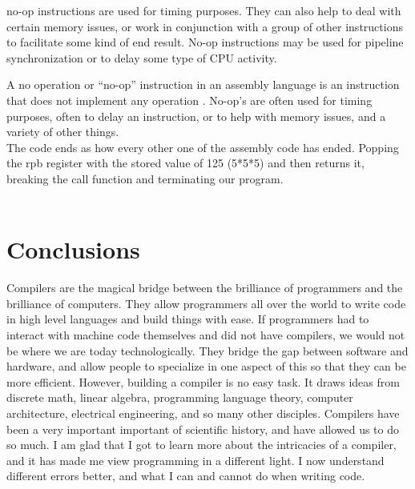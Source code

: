 \documentclass{article}
\theoremstyle{theorem}
\theoremstyle{definition}
\theoremstyle{remark}
\begin{document}
no-op instructions are used for timing purposes. They can also help to deal with certain memory issues, or work in conjunction with a group of other instructions to facilitate some kind of end result. No-op instructions may be used for pipeline synchronization or to delay some type of CPU activity.

A no operation or “no-op” instruction in an assembly language is an instruction that does not implement any operation \cite{TECHNOPEDIA}. No-op's are often used for timing purposes, often to delay an instruction, or to help with memory issues, and a variety of other things.
\\

The code ends as how every other one of the assembly code has ended. Popping the rpb register with the stored value of 125 (5*5*5) and then returns it, breaking the call function and terminating our program.
\\
\\


\medskip\noindent


\section{Conclusions}\label{conclusions}
Compilers are the magical bridge between the brilliance of programmers and the brilliance of computers. They allow programmers all over the world to write code in high level languages and build things with ease. If programmers had to interact with machine code themselves and did not have compilers, we would not be where we are today technologically. They bridge the gap between software and hardware, and allow people to specialize in one aspect of this so that they can be more efficient. However, building a compiler is no easy task. It draws ideas from discrete math, linear algebra, programming language theory, computer architecture, electrical engineering, and so many other disciples. Compilers have been a very important important of scientific history, and have allowed us to do so much. I am glad that I got to learn more about the intricacies of a compiler, and it has made me view programming in a different light. I now understand different errors better, and what I can and cannot do when writing code.
\end{document}
